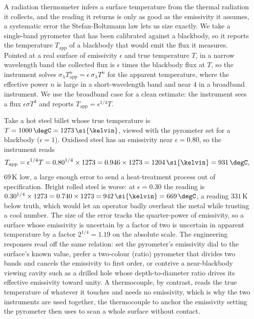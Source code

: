 A radiation thermometer infers a surface temperature from the thermal
radiation it collects, and the reading it returns is only as good as the
emissivity it assumes, a systematic error the Stefan-Boltzmann law lets us
size exactly. We take a single-band pyrometer that has been calibrated
against a blackbody, so it reports the temperature $T_{\text{app}}$ of a
blackbody that would emit the flux it measures. Pointed at a real surface
of emissivity $\epsilon$ and true temperature $T$, in a narrow wavelength
band the collected flux is $\epsilon$ times the blackbody flux at $T$, so
the instrument solves $\sigma_\lambda T_{\text{app}}^n = \epsilon\,
\sigma_\lambda T^n$ for the apparent temperature, where the effective
power $n$ is large in a short-wavelength band and near $4$ in a broadband
instrument. We use the broadband case for a clean estimate: the instrument
sees a flux $\epsilon\sigma T^4$ and reports $T_{\text{app}} =
\epsilon^{1/4} T$.

Take a hot steel billet whose true temperature is $T = 1000\,\degC =
1273\,\si{\kelvin}$, viewed with the pyrometer set for a blackbody
($\epsilon = 1$). Oxidised steel has an emissivity near $\epsilon = 0.80$,
so the instrument reads
\[
T_{\text{app}} = \epsilon^{1/4} T = 0.80^{1/4}\times1273 = 0.946\times
1273 = 1204\,\si{\kelvin} = 931\,\degC,
\]
$69\,\si{\kelvin}$ low, a large enough error to send a heat-treatment
process out of specification. Bright rolled steel is worse: at
$\epsilon = 0.30$ the reading is $0.30^{1/4}\times1273 = 0.740\times1273 =
942\,\si{\kelvin} = 669\,\degC$, a reading $331\,\si{\kelvin}$ below truth,
which would let an operator badly overheat the metal while trusting a cool
number. The size of the error tracks the quarter-power of emissivity, so a
surface whose emissivity is uncertain by a factor of two is uncertain in
apparent temperature by a factor $2^{1/4} = 1.19$ on the absolute scale.
The engineering responses read off the same relation: set the pyrometer's
emissivity dial to the surface's known value, prefer a two-colour
(ratio) pyrometer that divides two bands and cancels the emissivity to
first order, or contrive a near-blackbody viewing cavity such as a drilled
hole whose depth-to-diameter ratio drives its effective emissivity toward
unity. A thermocouple, by contrast, reads the true temperature of whatever
it touches and needs no emissivity, which is why the two instruments are
used together, the thermocouple to anchor the emissivity setting the
pyrometer then uses to scan a whole surface without contact.

